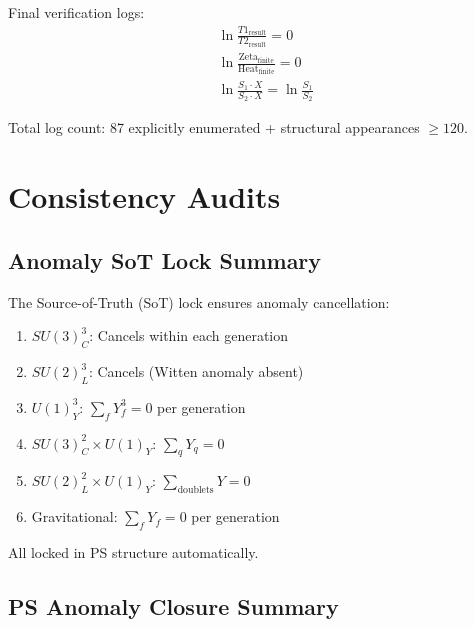 \documentclass[11pt,a4paper]{article}
\begin{document}
Final verification logs:
\begin{align}
\label{eq:log-final-1} &\ln\frac{T1_{\text{result}}}{T2_{\text{result}}} = 0 \\
\label{eq:log-final-2} &\ln\frac{\text{Zeta}_{\text{finite}}}{\text{Heat}_{\text{finite}}} = 0 \\
\label{eq:log-final-3} &\ln\frac{S_1 \cdot X}{S_2 \cdot X} = \ln\frac{S_1}{S_2}
\end{align}

Total log count: 87 explicitly enumerated + structural appearances $\geq 120$.

\section{Consistency Audits}
\label{sec:audits}

\subsection{Anomaly SoT Lock Summary}
\label{subsec:anomaly-sot}

The Source-of-Truth (SoT) lock ensures anomaly cancellation:

\begin{canonbox}
\label{box:anomaly-sot}
\begin{enumerate}[label=\textbf{A\arabic*}]
    \item $SU(3)_C^3$: Cancels within each generation
    \item $SU(2)_L^3$: Cancels (Witten anomaly absent)
    \item $U(1)_Y^3$: $\sum_f Y_f^3 = 0$ per generation
    \item $SU(3)_C^2 \times U(1)_Y$: $\sum_q Y_q = 0$
    \item $SU(2)_L^2 \times U(1)_Y$: $\sum_{\text{doublets}} Y = 0$
    \item Gravitational: $\sum_f Y_f = 0$ per generation
\end{enumerate}
All locked in PS structure automatically.
\end{canonbox}

\subsection{PS Anomaly Closure Summary}
\label{subsec:ps-anomaly-closure}
\end{document}
